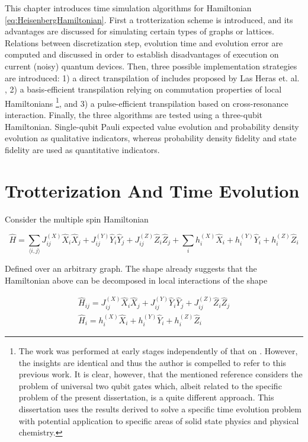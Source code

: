 This chapter introduces time simulation algorithms for Hamiltonian \ref{eq:HeisenbergHamiltonian}. First a trotterization scheme is introduced, and its advantages are discussed for simulating certain types of graphs or lattices. Relations between discretization step, evolution time and evolution error are computed and discussed in order to establish disadvantages of execution on current (noisy) quantum devices. Then, three possible implementation strategies are introduced: 1) a direct transpilation of includes proposed by Las Heras et. al. \cite{HubbardSimulLasHeras}, 2) a basis-efficient transpilation relying on commutation properties of local Hamiltonians \footnote{The work was performed at early stages independently of that on \cite{BellUniversalCartan}. However, the insights are identical and thus the author is compelled to refer to this previous work. It is clear, however, that the mentioned reference considers the problem of universal two qubit gates which, albeit related to the specific problem of the present dissertation, is a quite different approach. This dissertation uses the results derived to solve a specific time evolution problem with potential application to specific areas of solid state physics and physical chemistry.}, and 3) a pulse-efficient transpilation based on cross-resonance interaction. Finally, the three algorithms are tested using a three-qubit Hamiltonian. Single-qubit Pauli expected value evolution and probability density evolution as qualitative indicators, whereas probability density fidelity and state fidelity are used as quantitative indicators.

\section{Trotterization And Time Evolution}
\label{sec:MainTrotterScheme}

  Consider the multiple spin Hamiltonian

  \begin{equation}
    \hat{H} = \sum_{\langle i,j \rangle} J_{ij}^{(X)} \hat{X}_i \hat{X}_j + J_{ij}^{(Y)} \hat{Y}_i \hat{Y}_j + J_{ij}^{(Z)} \hat{Z}_i \hat{Z}_j + \sum_i h_i^{(X)} \hat{X}_i + h_i^{(Y)} \hat{Y}_i + h_i^{(Z)} \hat{Z}_i
    \label{eq:HeisenbergHamiltonian2}
  \end{equation}

  Defined over an arbitrary graph. The shape already suggests that the Hamiltonian above can be decomposed in local interactions of the shape

  \begin{gather}
    \hat{H}_{ij} = J_{ij}^{(X)} \hat{X}_i \hat{X}_j + J_{ij}^{(Y)} \hat{Y}_i \hat{Y}_j + J_{ij}^{(Z)} \hat{Z}_i \hat{Z}_j \\
    \hat{H}_{i} = h_i^{(X)} \hat{X}_i + h_i^{(Y)} \hat{Y}_i + h_i^{(Z)} \hat{Z}_i
    \label{eq:HamiltonianDecomposition}
  \end{gather}

